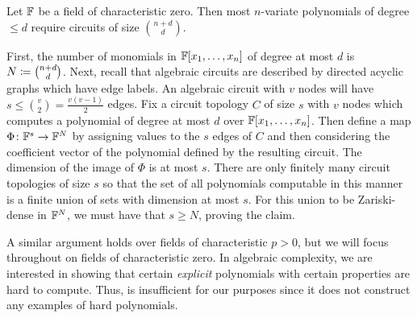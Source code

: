 \documentclass[letterpaper, 11pt]{amsart}
\newif\iffull
\begin{document}
\begin{prop}\label{prop:most_hard}
  Let $\mathbb{F}$ be a field of characteristic zero.
  Then most $n$-variate polynomials of degree $\leq d$ require circuits of size $\binom{n + d}{d}$.
\end{prop}
\begin{pf}
  First, the number of monomials in $\mathbb{F}[x_1, \ldots, x_n]$ of degree at most $d$ is $N \coloneqq \binom{n + d}{d}$.
  Next, recall that algebraic circuits are described by directed acyclic graphs which have edge labels.
  An algebraic circuit with $v$ nodes will have $s \leq \binom{v}{2} = \frac{v(v - 1)}{2}$ edges.
  Fix a circuit topology $C$ of size $s$ with $v$ nodes which computes a polynomial of degree at most $d$ over $\mathbb{F}[x_1, \ldots, x_n]$.
  Then define a map $\Phi\colon \mathbb{F}^s \to \mathbb{F}^N$ by assigning values to the $s$ edges of $C$ and then considering the coefficient vector of the polynomial defined by the resulting circuit.
  The dimension of the image of $\Phi$ is at most $s$.
  There are only finitely many circuit topologies of size $s$ so that the set of all polynomials computable in this manner is a finite union of sets with dimension at most $s$.
  For this union to be Zariski-dense in $\mathbb{F}^N$, we must have that $s \geq N$, proving the claim.
\end{pf}

\iffull
\clearpage
\fi

A similar argument holds over fields of characteristic $p > 0$, but we will focus throughout on fields of characteristic zero.
In algebraic complexity, we are interested in showing that certain \emph{explicit} polynomials with certain properties are hard to compute.
Thus,  is insufficient for our purposes since it does not construct any examples of hard polynomials.
\end{document}
